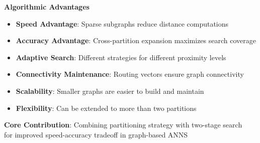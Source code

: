 \begin{frame}
\begin{center}
\LARGE\textbf{Algorithmic Advantages}
\end{center}

\vspace{5mm}

\begin{itemize}
    \item \textbf{Speed Advantage}: Sparse subgraphs reduce distance computations
    \item \textbf{Accuracy Advantage}: Cross-partition expansion maximizes search coverage
    \item \textbf{Adaptive Search}: Different strategies for different proximity levels
    \item \textbf{Connectivity Maintenance}: Routing vectors ensure graph connectivity
    \item \textbf{Scalability}: Smaller graphs are easier to build and maintain
    \item \textbf{Flexibility}: Can be extended to more than two partitions
\end{itemize}

\vspace{5mm}
\begin{center}
\textbf{Core Contribution}: Combining partitioning strategy with two-stage search\\
for improved speed-accuracy tradeoff in graph-based ANNS
\end{center}
\end{frame}%
